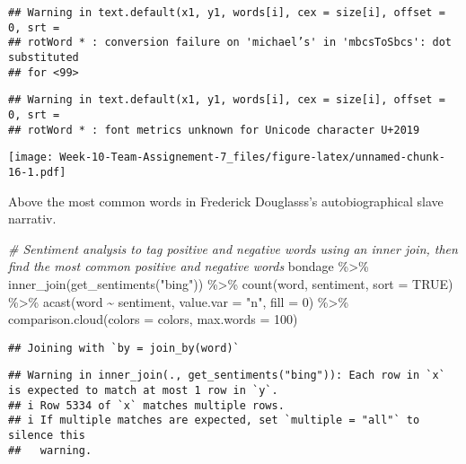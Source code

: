 \documentclass[
]{article}
\newenvironment{Shaded}{\begin{snugshade}}{\end{snugshade}}
\newcommand{\AttributeTok}[1]{\textcolor[rgb]{0.77,0.63,0.00}{#1}}
\newcommand{\CommentTok}[1]{\textcolor[rgb]{0.56,0.35,0.01}{\textit{#1}}}
\newcommand{\ConstantTok}[1]{\textcolor[rgb]{0.00,0.00,0.00}{#1}}
\newcommand{\DecValTok}[1]{\textcolor[rgb]{0.00,0.00,0.81}{#1}}
\newcommand{\FunctionTok}[1]{\textcolor[rgb]{0.00,0.00,0.00}{#1}}
\newcommand{\NormalTok}[1]{#1}
\newcommand{\SpecialCharTok}[1]{\textcolor[rgb]{0.00,0.00,0.00}{#1}}
\newcommand{\StringTok}[1]{\textcolor[rgb]{0.31,0.60,0.02}{#1}}
\begin{document}
\begin{verbatim}
## Warning in text.default(x1, y1, words[i], cex = size[i], offset = 0, srt =
## rotWord * : conversion failure on 'michael’s' in 'mbcsToSbcs': dot substituted
## for <99>
\end{verbatim}

\begin{verbatim}
## Warning in text.default(x1, y1, words[i], cex = size[i], offset = 0, srt =
## rotWord * : font metrics unknown for Unicode character U+2019
\end{verbatim}

\texttt{[image: Week-10-Team-Assignement-7\_files/figure-latex/unnamed-chunk-16-1.pdf]}

Above the most common words in Frederick Douglasss's autobiographical
slave narrativ.

\begin{Shaded}
\begin{Highlighting}[]
\CommentTok{\# Sentiment analysis to tag positive and negative words using an inner join, then find the most common positive and negative words}
\NormalTok{bondage }\SpecialCharTok{\%\textgreater{}\%}
  \FunctionTok{inner\_join}\NormalTok{(}\FunctionTok{get\_sentiments}\NormalTok{(}\StringTok{"bing"}\NormalTok{)) }\SpecialCharTok{\%\textgreater{}\%}
  \FunctionTok{count}\NormalTok{(word, sentiment, }\AttributeTok{sort =} \ConstantTok{TRUE}\NormalTok{) }\SpecialCharTok{\%\textgreater{}\%}
  \FunctionTok{acast}\NormalTok{(word }\SpecialCharTok{\textasciitilde{}}\NormalTok{ sentiment, }\AttributeTok{value.var =} \StringTok{"n"}\NormalTok{, }\AttributeTok{fill =} \DecValTok{0}\NormalTok{) }\SpecialCharTok{\%\textgreater{}\%}
  \FunctionTok{comparison.cloud}\NormalTok{(}\AttributeTok{colors =}\NormalTok{ colors,}
                   \AttributeTok{max.words =} \DecValTok{100}\NormalTok{)}
\end{Highlighting}
\end{Shaded}

\begin{verbatim}
## Joining with `by = join_by(word)`
\end{verbatim}

\begin{verbatim}
## Warning in inner_join(., get_sentiments("bing")): Each row in `x` is expected to match at most 1 row in `y`.
## i Row 5334 of `x` matches multiple rows.
## i If multiple matches are expected, set `multiple = "all"` to silence this
##   warning.
\end{verbatim}
\end{document}
